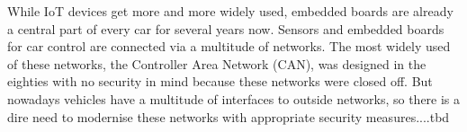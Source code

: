 
While IoT devices get more and more widely used, embedded boards are already a
central part of every car for several years now. Sensors and embedded boards for
car control are connected via a multitude of networks. The most widely used of
these networks, the Controller Area Network (CAN), was designed in the eighties
with no security in mind because these networks were closed off. But nowadays
vehicles have a multitude of interfaces to outside networks, so there is a dire
need to modernise these networks with appropriate security measures....tbd

